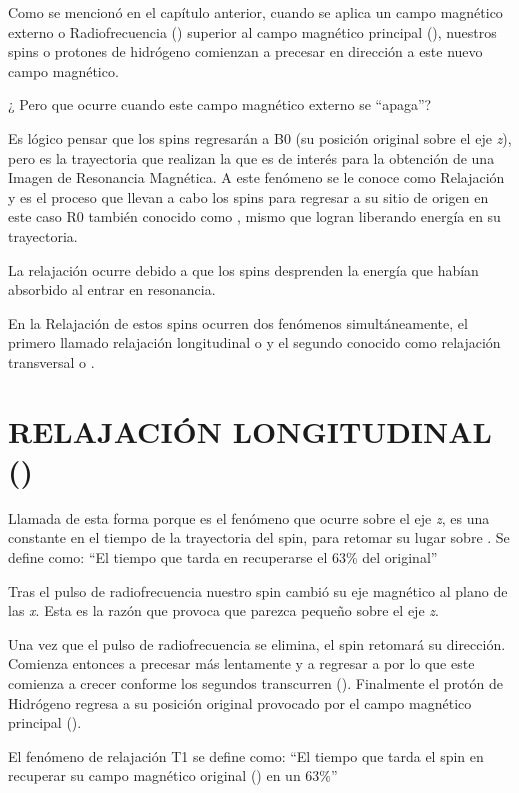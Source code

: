 




Como se mencionó en el capítulo anterior, cuando se aplica un campo magnético externo o Radiofrecuencia (\Bone) superior al campo magnético principal (\Bzero),  nuestros spins o protones de hidrógeno comienzan a precesar en dirección a este nuevo campo magnético.

¿ Pero que ocurre cuando este campo magnético externo  se “apaga”?

Es lógico pensar que los spins regresarán a B0 (su posición original sobre el eje \textit{z}),  pero es la trayectoria que realizan la que es de interés para la obtención de una Imagen de Resonancia Magnética. A este fenómeno se le conoce como Relajación y es el proceso que llevan a cabo los spins para regresar a su sitio de origen en este caso R0 también conocido como \Mz, mismo que logran liberando energía en su trayectoria. 

La relajación ocurre debido a que los spins desprenden la energía que habían absorbido al entrar en resonancia.


En la Relajación de estos spins ocurren dos fenómenos simultáneamente, el primero llamado relajación longitudinal o \Tone y el segundo conocido como relajación transversal o \Ttwo. 

\section{RELAJACIÓN LONGITUDINAL (\Tone)}

Llamada de esta forma porque es el fenómeno que ocurre sobre el eje \textit{z}, es una constante en el tiempo de la trayectoria del spin, para retomar su lugar sobre \Mzero.
Se define como: ``El tiempo que tarda en recuperarse el 63\% del \Mz original''


Tras  el pulso de radiofrecuencia nuestro spin cambió su eje magnético al plano de las \textit{x}. Esta es la razón que provoca  que parezca pequeño sobre el eje \textit{z}.

Una vez que el pulso de radiofrecuencia se elimina, el spin retomará su dirección. Comienza entonces a precesar más lentamente y a regresar a \Mz por lo que este comienza a crecer conforme los segundos transcurren (\Tone). Finalmente el protón de Hidrógeno regresa a su posición original provocado por el campo magnético principal (\Mz).


El fenómeno de relajación T1 se define como:
``El tiempo que tarda el spin en recuperar su campo magnético original (\Mz) en un 63\%''

